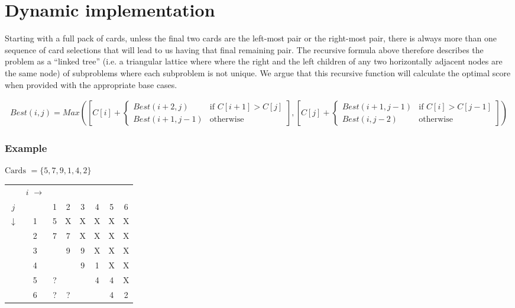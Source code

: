 \documentclass[11pt]{article}
\begin{document}
\section{Dynamic implementation}
Starting with a full pack of cards, unless the final two cards are the left-most pair or the right-most pair, there is always more than one sequence of card selections that will lead to us having that final remaining pair. The recursive formula above therefore describes the problem as a ``linked tree'' (i.e. a triangular lattice where where the right and the left children of any two horizontally adjacent nodes are the same node) of subproblems where each subproblem is not unique. We argue that this recursive function will calculate the optimal score when provided with the appropriate base cases.


\footnotesize
\begin{align*}
	Best(i, j) = Max\left( 
	\left[C[i] +
	\begin{cases}
		Best(i+2,j) & \text{if $C[i+1] > C[j]$} \\
		Best(i+1,j-1) & \text{otherwise}
	\end{cases}
	\right]
	,
	\left[
	C[j] +
	\begin{cases}
		Best(i+1,j-1) & \text{if $C[i] > C[j-1]$} \\
		Best(i,j-2) & \text{otherwise}
	\end{cases}
\right]
	\right)
\end{align*}
\normalsize

\subsubsection*{Example}
	$\text{Cards } = \{5,7,9,1,4,2\}$

	\begin{tabular}[c]{cc|cccccc}
		& $i$ $\rightarrow$\\

		$j$          &   & 1 & 2 & 3 & 4 & 5 & 6 \\
		             \cline{2-8}
		$\downarrow$ & 1 & 5 & X & X & X & X & X \\
		             & 2 & 7 & 7 & X & X & X & X \\
		             & 3 &   & 9 & 9 & X & X & X \\
		             & 4 &   &   & 9 & 1 & X & X \\
		             & 5 & ? &   &   & 4 & 4 & X \\
		             & 6 & ? & ? &   &   & 4 & 2
		
	\end{tabular}
\end{document}
